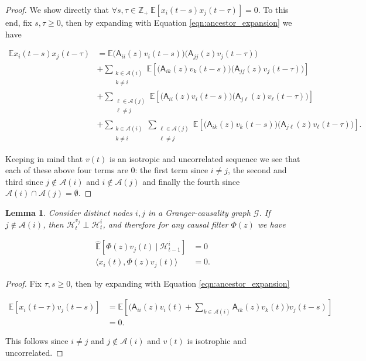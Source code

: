 \documentclass{statsoc}
\def\gcg{\mathcal{G}}  %
\def\A{\mathsf{A}}  %
\def\H{\mathcal{H}}  %
\newcommand{\linE}[2]{\hat{\E}[#1\ |\ #2]}  %
\newcommand{\anc}[1]{\mathcal{A}(#1)}  %
\newtheorem{lemma}{Lemma}
\def\H{\mathcal{H}}  %
\def\E{\mathbb{E}}  %
\def\Z{\mathbb{Z}}  %
\newcommand{\inner}[2]{\langle #1, #2 \rangle}  %
\begin{document}
\begin{proof}
  We show directly that
  $\forall s, \tau \in \Z_+\ \E[x_i(t - s)x_j(t - \tau)] = 0$.  To this end, fix
  $s, \tau \ge 0$, then by expanding with Equation
  \eqref{eqn:ancestor_expansion} we have

  \begin{align*}
    \E x_i(t - s)x_j(t - \tau)
    &= \E \big(\A_{ii}(z)v_i(t - s)\big)\big(\A_{jj}(z)v_j(t - \tau)\big)\\
    &+ \sum_{\substack{k \in \anc{i} \\ k \ne i}}\E[\big(\A_{ik}(z)v_k(t - s)\big)\big(\A_{jj}(z)v_j(t - \tau)\big)]\\
    &+ \sum_{\substack{\ell \in \anc{j} \\ \ell \ne j}}\E[\big(\A_{ii}(z)v_i(t - s)\big) \big(\A_{j\ell}(z) v_\ell(t - \tau)\big)]\\
    &+ \sum_{\substack{k \in \anc{i} \\ k \ne i}}\sum_{\substack{\ell \in \anc{j} \\ \ell \ne j}}\E[\big(\A_{ik}(z)v_k(t - s)\big)\big(\A_{j\ell}(z)v_\ell(t - \tau)\big)].
  \end{align*}
  
  Keeping in mind that $v(t)$ is an isotropic and uncorrelated
  sequence we see that each of these above four terms are 0: the
  first term since $i \ne j$, the second and third since
  $j \not\in \anc{i}$ and $i \not\in \anc{j}$ and finally the fourth since
  $\anc{i} \cap \anc{j} = \emptyset$.
\end{proof}

\begin{lemma}
  \label{lem:vj_perp}
  Consider distinct nodes $i, j$ in a Granger-causality graph $\gcg$.
  If $j \not \in \anc{i}$, then $\H_t^{v_j} \perp \H_{t}^{i}$, and therefore
  for any causal filter $\Phi(z)$ we have

  \begin{align*}
    \linE{\Phi(z)v_j(t)}{\H_{t - 1}^i} &= 0\\
    \inner{x_i(t)}{\Phi(z)v_j(t)} & = 0.
  \end{align*}
\end{lemma}
\begin{proof}
  Fix $\tau, s \ge 0$, then by expanding with Equation \ref{eqn:ancestor_expansion}

  \begin{align*}
    \E[x_i(t - \tau)v_j(t - s)] &= \E[\big(\A_{ii}(z)v_i(t) + \sum_{k \in \anc{i}}\A_{ik}(z)v_k(t) \big) v_j(t - s)]\\
    &= 0.
  \end{align*}

  This follows since $i \ne j$ and $j \not \in \anc{i}$ and $v(t)$ is
  isotrophic and uncorrelated.
\end{proof}
\end{document}
